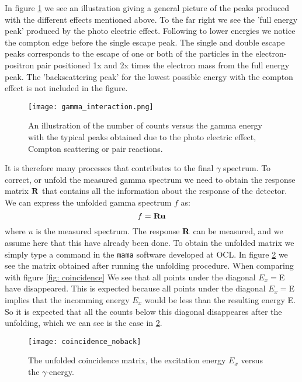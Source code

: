 \documentclass[11pt,a4wide]{article}
\begin{document}
In figure \ref{fig: gamma_interaction} we see an illustration giving a general picture of the peaks produced with the different effects mentioned above. To the far right we see the 'full energy peak' produced by the photo electric effect. Following to lower energies we notice the compton edge before the single escape peak. The single and double escape peaks corresponds to the escape of one or both of the particles in the electron-positron pair positioned 1x and 2x times the electron mass from the full energy peak. The 'backscattering peak' for the lowest possible energy with the compton effect is not included in the figure.

\begin{figure}[htp]
\centering
\texttt{[image: gamma\_interaction.png]}
\caption{An illustration of the number of counts versus the gamma energy with the typical peaks obtained due to the photo electric effect, Compton scattering or pair reactions. }
\label{fig: gamma_interaction}
\end{figure}

It is therefore many processes that contributes to the final $\gamma$ spectrum. To correct, or unfold the measured gamma spectrum we need to obtain the response matrix $\bf R$ that contains all the information about the response of the detector. We can express the unfolded gamma spectrum $f$ as:
\[
f = \bf{R} u
\]
where $u$ is the measured spectrum. The response $\bf R$ can be measured, and we assume here that this have already been done. To obtain the unfolded matrix we simply type a command in the \texttt{mama} software developed at OCL. In figure \ref{fig: un_coincidence} we see the matrix obtained after running the unfolding procedure. When comparing with figure \ref{fig: coincidence} We see that all points under the diagonal $E_x=$E have disappeared. This is expected because all points under the diagonal $E_x=$E implies that the incomming energy $E_x$ would be less than the resulting energy E. So it is expected that all the counts below this diagonal disappeares after the unfolding, which we can see is the case in \ref{fig: un_coincidence}. 

\begin{figure}[htp]
\centering
\texttt{[image: coincidence\_noback]}
\caption{The unfolded coincidence matrix, the excitation energy $E_x$ versus the $\gamma$-energy.}
\label{fig: un_coincidence}
\end{figure}

\end{document}
